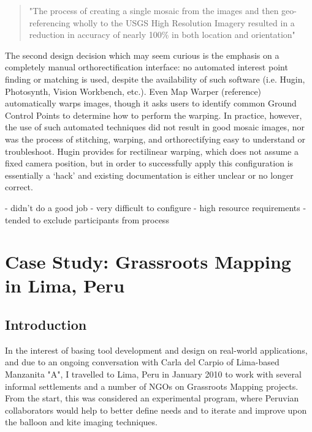 \documentclass[11pt]{report}
\begin{document}
\begin{quote}
"The process of creating a single mosaic from the images and then geo-referencing wholly to the USGS High Resolution Imagery resulted in a reduction in accuracy of nearly 100\% in both location and orientation"
\cite{wolf2006lowcost}
\end{quote}

The second design decision which may seem curious is the emphasis on a completely manual orthorectification interface: no automated interest point finding or matching is used, despite the availability of such software (i.e. Hugin, Photosynth, Vision Workbench, etc.). Even Map Warper (reference) automatically warps images, though it asks users to identify common Ground Control Points to determine how to perform the warping. In practice, however, the use of such automated techniques did not result in good mosaic images, nor was the process of stitching, warping, and orthorectifying easy to understand or troubleshoot. Hugin provides for rectilinear warping, which does not assume a fixed camera position, but in order to successfully apply this configuration is essentially a `hack' and existing documentation is either unclear or no longer correct.



- didn't do a good job
- very difficult to configure
- high resource requirements
- tended to exclude participants from process



\chapter{Case Study: Grassroots Mapping in Lima, Peru}

\section{Introduction}

In the interest of basing tool development and design on real-world applications, and due to an ongoing conversation with Carla del Carpio of Lima-based Manzanita "A", I travelled to Lima, Peru in January 2010 to work with several informal settlements and a number of NGOs on Grassroots Mapping projects. From the start, this was considered an experimental program, where Peruvian collaborators would help to better define needs and to iterate and improve upon the balloon and kite imaging techniques.
\end{document}
